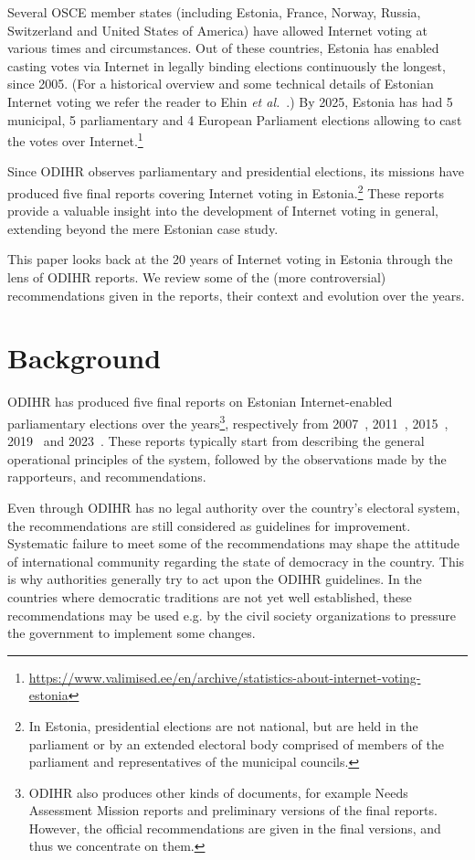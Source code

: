 \documentclass{llncs}
\newcommand{\footurl}[1]{\footnote{\url{#1}}}
\begin{document}
Several OSCE member states (including Estonia, France, Norway, Russia, Switzerland and United States of America) have allowed Internet voting at various times and circumstances. Out of these countries, Estonia has enabled casting votes via Internet in legally binding elections continuously the longest, since 2005. (For a historical overview and some technical details of Estonian Internet voting we refer the reader to Ehin \emph{et al.}~\cite{EHIN2022101718}.) By 2025, Estonia has had 5  municipal, 5 parliamentary and 4 European Parliament elections allowing to cast the votes over Internet.\footurl{https://www.valimised.ee/en/archive/statistics-about-internet-voting-estonia}

Since ODIHR observes parliamentary and presidential elections, its missions have produced five final reports covering Internet voting in Estonia.\footnote{In Estonia, presidential elections are not national, but are held in the parliament or by an extended electoral body comprised of members of the parliament and representatives of the municipal councils.} These reports provide a valuable insight into the development of Internet voting in general, extending beyond the mere Estonian case study. 

This paper looks back at the 20 years of Internet voting in Estonia through the lens of ODIHR reports. We review some of the (more controversial) recommendations given in the reports, their context and evolution over the years. 

\section{Background}

ODIHR has produced five final reports on Estonian Internet-enabled parliamentary elections over the years\footnote{ODIHR also produces other kinds of documents, for example Needs Assessment Mission reports and preliminary versions of the final reports. However, the official recommendations are given in the final versions, and thus we concentrate on them.}, respectively from 2007~\cite{ODIHR2007}, 2011~\cite{ODIHR2011}, 2015~\cite{ODIHR2015}, 2019~\cite{ODIHR2019} and 2023~\cite{ODIHR2023}. These reports typically start from describing the general operational principles of the system, followed by the observations made by the rapporteurs, and recommendations. 

Even through ODIHR has no legal authority over the country's electoral system, the recommendations are still considered as guidelines for improvement. Systematic failure to meet some of the recommendations may shape the attitude of international community regarding the state of democracy in the country. This is why authorities generally try to act upon the ODIHR guidelines. In the countries where democratic traditions are not yet well established, these recommendations may be used e.g. by the civil society organizations to pressure the government to implement some changes.
\end{document}
